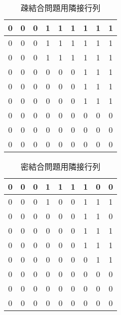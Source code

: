 \documentclass[a4j]{jarticle}
\begin{document}
\begin{table}[htb]
 \begin{center}
  \begin{tabular}[tb]{|c|c|c|c|c|c|c|c|c|} \hline
0 & 0 & 0 & 1 & 1 & 1 & 1 & 1 & 1 \\ \hline
0 & 0 & 0 & 1 & 1 & 1 & 1 & 1 & 1 \\ \hline
0 & 0 & 0 & 1 & 1 & 1 & 1 & 1 & 1 \\ \hline
0 & 0 & 0 & 0 & 0 & 0 & 1 & 1 & 1 \\ \hline
0 & 0 & 0 & 0 & 0 & 0 & 1 & 1 & 1 \\ \hline
0 & 0 & 0 & 0 & 0 & 0 & 1 & 1 & 1 \\ \hline
0 & 0 & 0 & 0 & 0 & 0 & 0 & 0 & 0 \\ \hline
0 & 0 & 0 & 0 & 0 & 0 & 0 & 0 & 0 \\ \hline
0 & 0 & 0 & 0 & 0 & 0 & 0 & 0 & 0 \\ \hline
  \end{tabular}
  \caption{疎結合問題用隣接行列}
 \label{sparse}
 \end{center}
\end{table}

\begin{table}[htb]
 \begin{center}
  \begin{tabular}[tb]{|c|c|c|c|c|c|c|c|c|} \hline
0 & 0 & 0 & 1 & 1 & 1 & 1 & 0 & 0 \\ \hline
0 & 0 & 0 & 1 & 0 & 0 & 1 & 1 & 1 \\ \hline
0 & 0 & 0 & 0 & 0 & 0 & 1 & 1 & 0 \\ \hline
0 & 0 & 0 & 0 & 0 & 0 & 1 & 1 & 1 \\ \hline
0 & 0 & 0 & 0 & 0 & 0 & 1 & 1 & 1 \\ \hline
0 & 0 & 0 & 0 & 0 & 0 & 0 & 1 & 1 \\ \hline
0 & 0 & 0 & 0 & 0 & 0 & 0 & 0 & 0 \\ \hline
0 & 0 & 0 & 0 & 0 & 0 & 0 & 0 & 0 \\ \hline
0 & 0 & 0 & 0 & 0 & 0 & 0 & 0 & 0 \\ \hline
  \end{tabular}
 \end{center}
  \caption{密結合問題用隣接行列}
 \label{dense}
\end{table}
\end{document}
